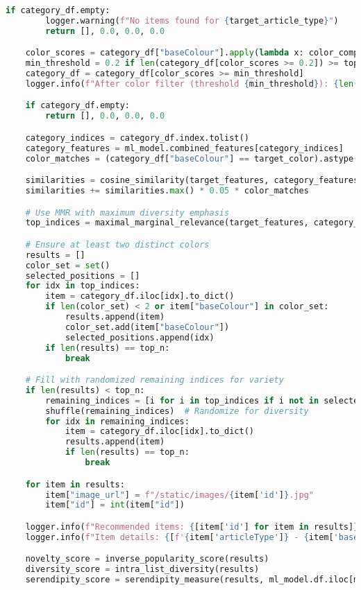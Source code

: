 \documentclass[12pt,a4paper]{article}
\begin{document}
\begin{lstlisting}[language=Python]
    if category_df.empty:
        logger.warning(f"No items found for {target_article_type}")
        return [], 0.0, 0.0, 0.0

    color_scores = category_df["baseColour"].apply(lambda x: color_compatibility(target_color, x))
    min_threshold = 0.2 if len(category_df[color_scores >= 0.2]) >= top_n * 2 else 0.0
    category_df = category_df[color_scores >= min_threshold]
    logger.info(f"After color filter (threshold {min_threshold}): {len(category_df)} items")

    if category_df.empty:
        return [], 0.0, 0.0, 0.0

    category_indices = category_df.index.tolist()
    category_features = ml_model.combined_features[category_indices]
    color_matches = (category_df["baseColour"] == target_color).astype(float)

    similarities = cosine_similarity(target_features, category_features).flatten()
    similarities += similarities.max() * 0.05 * color_matches

    # Use MMR with maximum diversity emphasis
    top_indices = maximal_marginal_relevance(target_features, category_features, top_n, lambda_param=0.1)

    # Ensure at least two distinct colors
    results = []
    color_set = set()
    selected_positions = []
    for idx in top_indices:
        item = category_df.iloc[idx].to_dict()
        if len(color_set) < 2 or item["baseColour"] in color_set:
            results.append(item)
            color_set.add(item["baseColour"])
            selected_positions.append(idx)
        if len(results) == top_n:
            break

    # Fill with randomized remaining indices for variety
    if len(results) < top_n:
        remaining_indices = [i for i in top_indices if i not in selected_positions]
        shuffle(remaining_indices)  # Randomize for diversity
        for idx in remaining_indices:
            item = category_df.iloc[idx].to_dict()
            results.append(item)
            if len(results) == top_n:
                break

    for item in results:
        item["image_url"] = f"/static/images/{item['id']}.jpg"
        item["id"] = int(item["id"])

    logger.info(f"Recommended items: {[item['id'] for item in results]}")
    logger.info(f"Item details: {[f'{item['articleType']} - {item['baseColour']}' for item in results]}")

    novelty_score = inverse_popularity_score(results)
    diversity_score = intra_list_diversity(results)
    serendipity_score = serendipity_measure(results, ml_model.df.iloc[ml_model.id_to_index[target_id]].to_dict()) if target_id else 0.0


\end{lstlisting}
\end{document}

